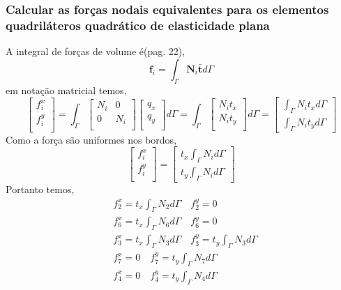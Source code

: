 \subsubsection{Calcular as forças nodais equivalentes para os elementos quadriláteros quadrático de elasticidade plana}

A integral de forças de volume é(pag. 22),
%
\begin{equation}
	\mathbf{f}_i = \int_{\Gamma} \mathbf{N}_i \mathbf{\bar t} d\Gamma
\end{equation}
%
em notação matricial temos,
%
\begin{equation}
	\begin{bmatrix}
		f^x_i\\
		f^y_i\\
	\end{bmatrix}
	=
	\int_{\Gamma}
	\begin{bmatrix}
		N_i&0\\
		0&N_i\\
	\end{bmatrix}
	\begin{bmatrix}
		q_x\\
		q_y\\
	\end{bmatrix}
	d\Gamma
	=
	\int_{\Gamma}
	\begin{bmatrix}
		N_i t_x\\
		N_i t_y\\
	\end{bmatrix}
	d\Gamma
	=
	\begin{bmatrix}
		\int_{\Gamma} N_i t_x d\Gamma\\
		\int_{\Gamma} N_i t_y d\Gamma
	\end{bmatrix}
\end{equation}
%
Como a força são uniformes nos bordos,
%
\begin{equation}
	\begin{bmatrix}
		f^x_i\\
		f^y_i\\
	\end{bmatrix}
	=
	\begin{bmatrix}
		t_x \int_{\Gamma} N_i d\Gamma\\
		t_y \int_{\Gamma} N_i d\Gamma
	\end{bmatrix}
\end{equation}
%
Portanto temos,
%
\begin{equation}
\begin{split}
&f^x_2 = t_x \int_{\Gamma} N_2 d\Gamma \quad f^y_2 = 0\\
&f^x_6 = t_x \int_{\Gamma} N_6 d\Gamma \quad f^y_6 = 0\\
&f^x_3 = t_x \int_{\Gamma} N_3 d\Gamma \quad f^y_3 =  t_y \int_{\Gamma} N_3 d\Gamma\\
&f^x_7 = 0 \quad f^y_7 =  t_y \int_{\Gamma} N_7 d\Gamma\\
&f^x_4 = 0 \quad f^y_4 = t_y \int_{\Gamma} N_4 d\Gamma
\end{split}
\end{equation}
